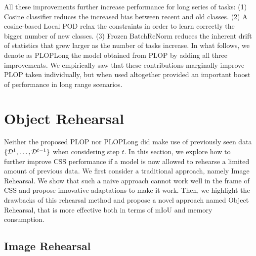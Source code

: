 All these improvements further increase performance for long series of tasks: (1) Cosine classifier
reduces the increased bias between recent and old classes. (2) A cosine-based Local POD relax the
constraints in order to learn correctly the bigger number of new classes. (3) Frozen BatchReNorm
reduces the inherent drift of statistics that grew larger as the number of tasks increase. In what
follows, we denote as PLOPLong the model obtained from PLOP by adding all three improvements. We
empirically saw that these contributions marginally improve PLOP taken individually, but when used
altogether provided an important boost of performance in long range scenarios.


\section{Object Rehearsal}
\label{sec:seg_rehearsal}

Neither the proposed PLOP nor PLOPLong did make use of previously seen data $\{\mathcal{D}^{1}, \dots,
    \mathcal{D}^{t-1}\}$ when considering step $t$. In this section, we explore how to further improve \ac{CSS}
performance if a model is now allowed to rehearse a limited amount of previous data. We first
consider a traditional approach, namely Image Rehearsal. We show that such a naive approach
cannot work well in the frame of \ac{CSS} and propose innovative adaptations to make it work. Then,
we highlight the drawbacks of this rehearsal method and propose a novel approach named Object
Rehearsal, that is more effective both in terms of \ac{mIoU} and memory consumption.

\subsection{Image Rehearsal}
\label{sec:seg_image_rehearsal}


